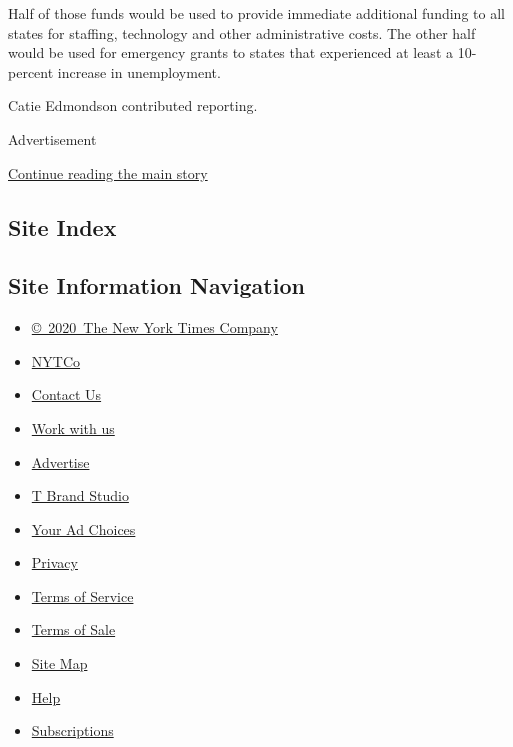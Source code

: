 Half of those funds would be used to provide immediate additional
funding to all states for staffing, technology and other administrative
costs. The other half would be used for emergency grants to states that
experienced at least a 10-percent increase in unemployment.

Catie Edmondson contributed reporting.

Advertisement

\protect\hyperlink{after-bottom}{Continue reading the main story}

\hypertarget{site-index}{%
\subsection{Site Index}\label{site-index}}

\hypertarget{site-information-navigation}{%
\subsection{Site Information
Navigation}\label{site-information-navigation}}

\begin{itemize}
\tightlist
\item
  \href{https://help.nytimes3xbfgragh.onion/hc/en-us/articles/115014792127-Copyright-notice}{©~2020~The
  New York Times Company}
\end{itemize}

\begin{itemize}
\tightlist
\item
  \href{https://www.nytco.com/}{NYTCo}
\item
  \href{https://help.nytimes3xbfgragh.onion/hc/en-us/articles/115015385887-Contact-Us}{Contact
  Us}
\item
  \href{https://www.nytco.com/careers/}{Work with us}
\item
  \href{https://nytmediakit.com/}{Advertise}
\item
  \href{http://www.tbrandstudio.com/}{T Brand Studio}
\item
  \href{https://www.nytimes3xbfgragh.onion/privacy/cookie-policy\#how-do-i-manage-trackers}{Your
  Ad Choices}
\item
  \href{https://www.nytimes3xbfgragh.onion/privacy}{Privacy}
\item
  \href{https://help.nytimes3xbfgragh.onion/hc/en-us/articles/115014893428-Terms-of-service}{Terms
  of Service}
\item
  \href{https://help.nytimes3xbfgragh.onion/hc/en-us/articles/115014893968-Terms-of-sale}{Terms
  of Sale}
\item
  \href{https://spiderbites.nytimes3xbfgragh.onion}{Site Map}
\item
  \href{https://help.nytimes3xbfgragh.onion/hc/en-us}{Help}
\item
  \href{https://www.nytimes3xbfgragh.onion/subscription?campaignId=37WXW}{Subscriptions}
\end{itemize}
